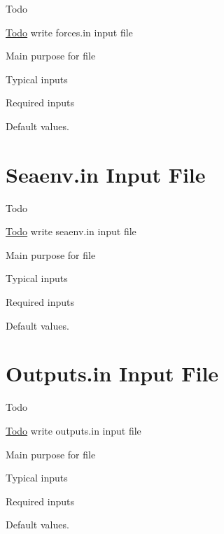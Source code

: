 \begin{DoxyRefDesc}{Todo}
\item[\hyperlink{todo__todo000009}{Todo}]write forces.\-in input file
\begin{DoxyItemize}
\item Main purpose for file
\item Typical inputs
\item Required inputs
\item Default values.
\end{DoxyItemize}\end{DoxyRefDesc}
\hypertarget{in_seaenv}{}\section{Seaenv.\-in Input File}\label{in_seaenv}
\begin{DoxyRefDesc}{Todo}
\item[\hyperlink{todo__todo000011}{Todo}]write seaenv.\-in input file
\begin{DoxyItemize}
\item Main purpose for file
\item Typical inputs
\item Required inputs
\item Default values.
\end{DoxyItemize}\end{DoxyRefDesc}
\hypertarget{in_outputs}{}\section{Outputs.\-in Input File}\label{in_outputs}
\begin{DoxyRefDesc}{Todo}
\item[\hyperlink{todo__todo000010}{Todo}]write outputs.\-in input file
\begin{DoxyItemize}
\item Main purpose for file
\item Typical inputs
\item Required inputs
\item Default values.
\end{DoxyItemize}\end{DoxyRefDesc}
